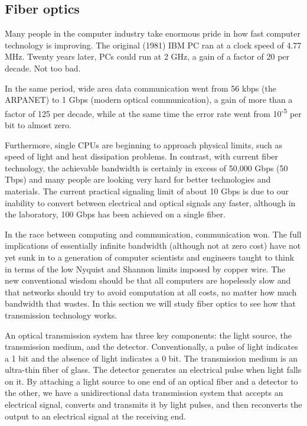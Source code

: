 \documentclass[b5paper,11pt]{memoir}
\begin{document}
\protect\hypertarget{0130661023_ch02lev1sec2.htmlux5cux23ch02lev2sec7}{}{}

\subsection{Fiber optics}

Many people in the computer industry take enormous pride in how fast
computer technology is improving. The original (1981) IBM PC ran at a
clock speed of 4.77 MHz. Twenty years later, PCs could run at 2 GHz, a
gain of a factor of 20 per decade. Not too bad.

In the same period, wide area data communication went from 56 kbps (the
ARPANET) to 1 Gbps (modern optical communication), a gain of more than a
factor of 125 per decade, while at the same time the error rate went
from 10\textsuperscript{-5} per bit to almost zero.

Furthermore, single CPUs are beginning to approach physical limits, such
as speed of light and heat dissipation problems. In contrast, with
{current} fiber technology, the achievable bandwidth is certainly in
excess of 50,000 Gbps (50 Tbps) and many people are looking very hard
for better technologies and materials. The current practical signaling
limit of about 10 Gbps is due to our inability to convert between
electrical and optical signals any faster, although in the laboratory,
100 Gbps has been achieved on a single fiber.

In the race between computing and communication, communication won. The
full implications of essentially infinite bandwidth (although not at
zero cost) have not yet sunk in to a generation of computer scientists
and engineers taught to think in terms of the low Nyquist and Shannon
limits imposed by copper wire. The new conventional wisdom should be
that all computers are hopelessly slow and that networks should try to
avoid computation at all costs, no matter how much bandwidth that
wastes. In this section we will study fiber optics to see how that
transmission technology works.

An optical transmission system has three key components: the light
source, the transmission medium, and the detector. Conventionally, a
pulse of light indicates a 1 bit and the absence of light indicates a 0
bit. The transmission medium is an ultra-thin fiber of glass. The
detector generates an electrical pulse when light falls on it. By
attaching a light source to one end of an optical fiber and a detector
to the other, we have a unidirectional data transmission system that
accepts an electrical signal, converts and transmits it by light pulses,
and then reconverts the output to an electrical signal at the receiving
end.
\end{document}
